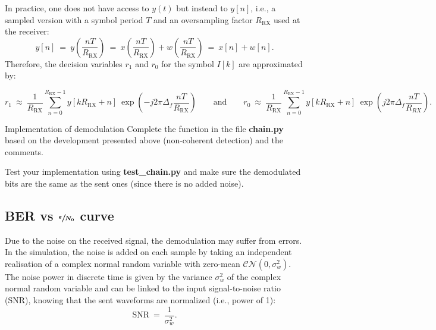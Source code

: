 In practice, one does not have access to $y(t)$ but instead to $y[n]$, i.e., a sampled version with a symbol period $T$ and an oversampling factor $R_{\text{RX}}$ used at the receiver:
\begin{equation*}
    y[n]\:=\:y\left(\frac{nT}{R_{\text{RX}}}\right)\:=\:x\left(\frac{nT}{R_{\text{RX}}}\right)+w\left(\frac{nT}{R_{\text{RX}}}\right)\:=\: x[n] + w[n].
\end{equation*}
Therefore, the decision variables $r_1$ and $r_0$ for the symbol $I[k]$ are approximated by:
\begin{small}
\begin{equation*}
    r_1\:\approx\:\frac{1}{R_{\text{RX}}}\sum_{n=0}^{R_{\text{RX}}-1} y[kR_{\text{RX}}+n] \:\exp \left(-j2\pi \Delta_f \frac{nT}{R_{\text{RX}}}\right)\qquad \text{and} \qquad r_0\:\approx\:\frac{1}{R_{\text{RX}}}\sum_{n=0}^{R_{\text{RX}}-1} y[kR_{\text{RX}}+n] \:\exp \left(j2\pi \Delta_f \frac{nT}{R_{RX}}\right).
\end{equation*}
\end{small}

\begin{bclogo}[couleur = gray!20, arrondi = 0.2, logo=\bccrayon]{Implementation of demodulation}
Complete the  function in the file \textbf{chain.py} based on the development presented above (non-coherent detection) and the comments.

Test your implementation using \textbf{test\_chain.py} and make sure the demodulated bits are the same as the sent ones (since there is no added noise).
\end{bclogo}

\subsection{BER vs $\boldsymbol{\sfrac{\varepsilon}{N_0}}$ curve}
Due to the noise on the received signal, the demodulation may suffer from errors. In the simulation, the noise is added on each sample by taking an independent realisation of a complex normal random variable with zero-mean $\mathcal{CN}(0,\sigma_w^2)$. The noise power in discrete time is given by the variance $\sigma_w^2$ of the complex normal random variable and can be linked to the input signal-to-noise ratio (SNR), knowing that the sent waveforms are normalized (i.e., power of 1):
\begin{equation*}
    \text{SNR}\:=\:\frac{1}{\sigma_w^2}.
\end{equation*}

